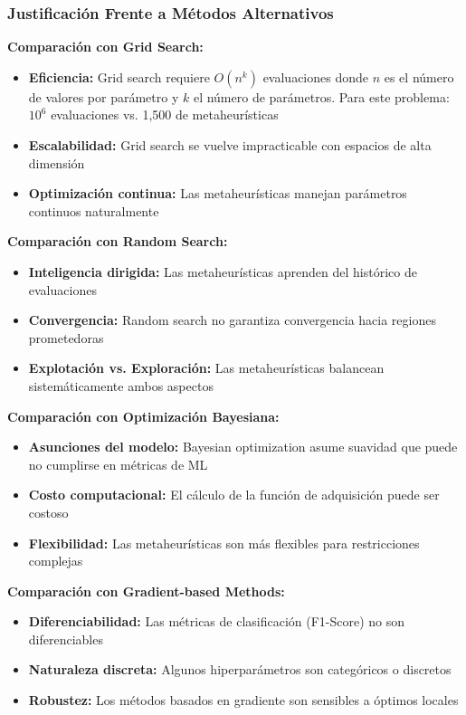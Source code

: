 \subsubsection{Justificación Frente a Métodos Alternativos}

\textbf{Comparación con Grid Search:}
\begin{itemize}
    \item \textbf{Eficiencia:} Grid search requiere $O(n^k)$ evaluaciones donde $n$ es el número de valores por parámetro y $k$ el número de parámetros. Para este problema: $10^6$ evaluaciones vs. 1,500 de metaheurísticas
    \item \textbf{Escalabilidad:} Grid search se vuelve impracticable con espacios de alta dimensión
    \item \textbf{Optimización continua:} Las metaheurísticas manejan parámetros continuos naturalmente
\end{itemize}

\textbf{Comparación con Random Search:}
\begin{itemize}
    \item \textbf{Inteligencia dirigida:} Las metaheurísticas aprenden del histórico de evaluaciones
    \item \textbf{Convergencia:} Random search no garantiza convergencia hacia regiones prometedoras
    \item \textbf{Explotación vs. Exploración:} Las metaheurísticas balancean sistemáticamente ambos aspectos
\end{itemize}

\textbf{Comparación con Optimización Bayesiana:}
\begin{itemize}
    \item \textbf{Asunciones del modelo:} Bayesian optimization asume suavidad que puede no cumplirse en métricas de ML
    \item \textbf{Costo computacional:} El cálculo de la función de adquisición puede ser costoso
    \item \textbf{Flexibilidad:} Las metaheurísticas son más flexibles para restricciones complejas
\end{itemize}

\textbf{Comparación con Gradient-based Methods:}
\begin{itemize}
    \item \textbf{Diferenciabilidad:} Las métricas de clasificación (F1-Score) no son diferenciables
    \item \textbf{Naturaleza discreta:} Algunos hiperparámetros son categóricos o discretos
    \item \textbf{Robustez:} Los métodos basados en gradiente son sensibles a óptimos locales
\end{itemize}

